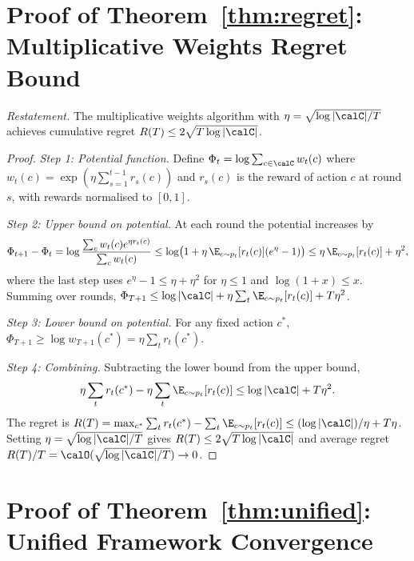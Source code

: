 \section{Proof of Theorem~\ref{thm:regret}: Multiplicative Weights Regret Bound}
\label{app:proof_regret}

\noindent\textit{Restatement.} The multiplicative weights algorithm with $\eta=\sqrt{\log|\calC|/T}$ achieves cumulative regret $R(T)\le 2\sqrt{T\log|\calC|}$.

\begin{proof}
\textit{Step 1: Potential function.} Define $\Phi_t = \log\sum_{c\in\calC}w_t(c)$ where $w_t(c) = \exp(\eta\sum_{s=1}^{t-1}r_s(c))$ and $r_s(c)$ is the reward of action $c$ at round $s$, with rewards normalised to $[0,1]$.

\textit{Step 2: Upper bound on potential.} At each round the potential increases by
\begin{equation}
\Phi_{t+1}-\Phi_t = \log\frac{\sum_c w_t(c)e^{\eta r_t(c)}}{\sum_c w_t(c)}
\le \log\bigl(1+\eta\,\E_{c\sim p_t}[r_t(c)](e^\eta-1)\bigr)
\le \eta\,\E_{c\sim p_t}[r_t(c)] + \eta^2,
\end{equation}
where the last step uses $e^\eta-1\le\eta+\eta^2$ for $\eta\le 1$ and $\log(1+x)\le x$. Summing over rounds, $\Phi_{T+1}\le\log|\calC|+\eta\sum_t\E_{c\sim p_t}[r_t(c)]+T\eta^2$.

\textit{Step 3: Lower bound on potential.} For any fixed action $c^*$, $\Phi_{T+1}\ge\log w_{T+1}(c^*) = \eta\sum_t r_t(c^*)$.

\textit{Step 4: Combining.} Subtracting the lower bound from the upper bound,
\begin{equation}
\eta\sum_t r_t(c^*) - \eta\sum_t\E_{c\sim p_t}[r_t(c)] \le \log|\calC| + T\eta^2.
\end{equation}
The regret is $R(T) = \max_{c^*}\sum_t r_t(c^*) - \sum_t\E_{c\sim p_t}[r_t(c)] \le (\log|\calC|)/\eta + T\eta$. Setting $\eta=\sqrt{\log|\calC|/T}$ gives $R(T)\le 2\sqrt{T\log|\calC|}$ and average regret $R(T)/T = \calO(\sqrt{\log|\calC|/T})\to 0$.
\end{proof}


\section{Proof of Theorem~\ref{thm:unified}: Unified Framework Convergence}
\label{app:proof_unified}

